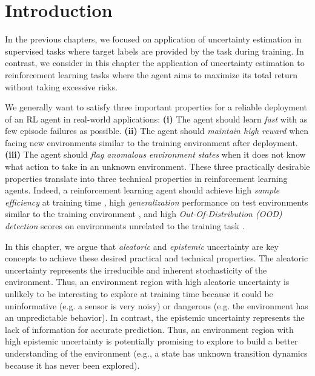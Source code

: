 \vspace{-3mm}
\section{Introduction}
\label{sec:introduction_011}

In the previous chapters, we focused on application of uncertainty estimation in supervised tasks where target labels are provided by the task during training. In contrast, we consider in this chapter the application of uncertainty estimation to reinforcement learning tasks where the agent aims to maximize its total return without taking excessive risks.

We generally want to satisfy three important properties for a reliable deployment of an RL agent in real-world applications: \textbf{(i)} The agent should learn \emph{fast} with as few episode failures as possible. \textbf{(ii)} The agent should \emph{maintain high reward} when facing new environments similar to the training environment after deployment. \textbf{(iii)} The agent should \emph{flag anomalous environment states} when it does not know what action to take in an unknown environment. These three practically desirable properties translate into three technical properties in reinforcement learning agents. Indeed, a reinforcement learning agent should achieve high \emph{sample efficiency} at training time \citep{sample-efficient-ac}, high \emph{generalization} performance on test environments similar to the training environment \citep{epistemic-pomdp}, and high \emph{Out-Of-Distribution (OOD) detection} scores on environments unrelated to the training task \citep{ood-detection-survey, ood-automotive-perception}. 

In this chapter, we argue that \emph{aleatoric} and \emph{epistemic} uncertainty are key concepts to achieve these desired practical and technical properties. The aleatoric uncertainty represents the irreducible and inherent stochasticity of the environment. Thus, an environment region with high aleatoric uncertainty is unlikely to be interesting to explore at training time because it could be uninformative (e.g. a sensor is very noisy) or dangerous (e.g. the environment has an unpredictable behavior). In contrast, the epistemic uncertainty represents the lack of information for accurate prediction. Thus, an environment region with high epistemic uncertainty is potentially promising to explore to build a better understanding of the environment (e.g., a state has unknown transition dynamics because it has never been explored).

